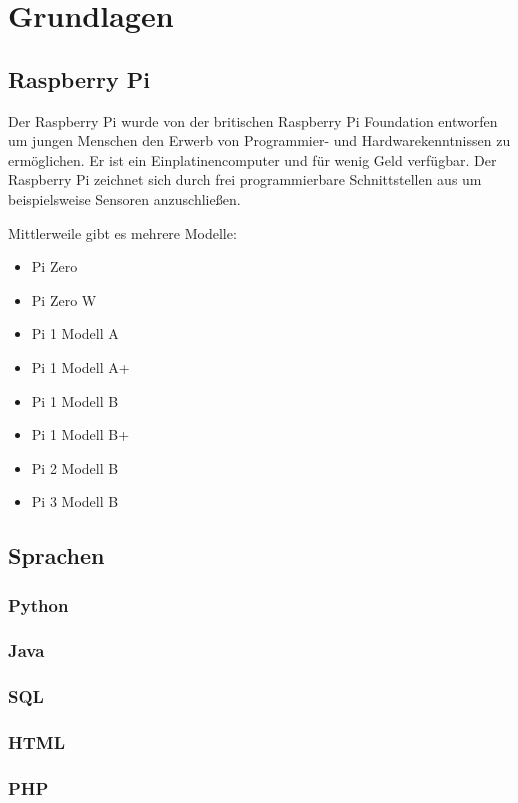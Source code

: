 \chapter{Grundlagen}

\section{Raspberry Pi}
Der Raspberry Pi wurde von der britischen Raspberry Pi Foundation entworfen um
jungen Menschen den Erwerb von Programmier- und Hardwarekenntnissen zu
ermöglichen. Er ist ein Einplatinencomputer und für wenig Geld verfügbar. Der
Raspberry Pi zeichnet sich durch frei programmierbare Schnittstellen aus um
beispielsweise Sensoren anzuschließen.

Mittlerweile gibt es mehrere Modelle:

\begin{itemize} 
\item Pi Zero 
\item Pi Zero W
\item Pi 1 Modell A
\item Pi 1 Modell A+
\item Pi 1 Modell B
\item Pi 1 Modell B+
\item Pi 2 Modell B
\item Pi 3 Modell B 
\end{itemize}


\section{Sprachen}

\subsection{Python}
\subsection{Java}

\subsection{SQL}

\subsection{HTML}

\subsection{PHP}

